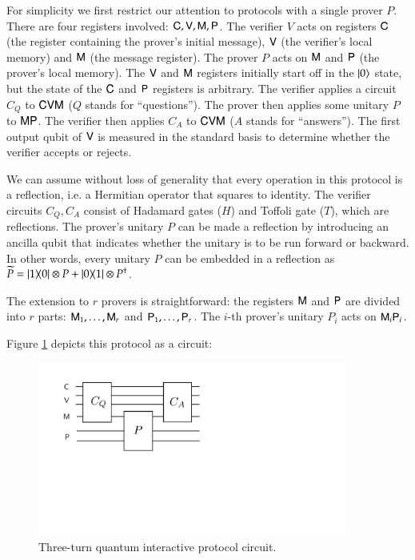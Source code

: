 
For simplicity we first restrict our attention to protocols with a single prover $P$. There are four registers involved: ${\mathsf{C}}, {\mathsf{V}}, {\mathsf{M}}, {\mathsf{P}}$. The verifier $V$ acts on registers ${\mathsf{C}}$ (the register containing the prover's initial message), ${\mathsf{V}}$ (the verifier's local memory) and ${\mathsf{M}}$ (the message register). The prover $P$ acts on ${\mathsf{M}}$ and ${\mathsf{P}}$ (the prover's local memory). The ${\mathsf{V}}$ and ${\mathsf{M}}$ registers initially start off in the $|0\rangle$ state, but the state of the ${\mathsf{C}}$ and ${\mathsf{P}}$ registers is arbitrary. The verifier applies a circuit $C_Q$ to ${\mathsf{C}} {\mathsf{V}} {\mathsf{M}}$ ($Q$ stands for ``questions''). The prover then applies some unitary $P$ to ${\mathsf{M}} {\mathsf{P}}$. The verifier then applies $C_A$ to ${\mathsf{C}} {\mathsf{V}} {\mathsf{M}}$ ($A$ stands for ``answers''). The first output qubit of ${\mathsf{V}}$ is measured in the standard basis to determine whether the verifier accepts or rejects.

We can assume without loss of generality that every operation in this protocol is a reflection, i.e. a Hermitian operator that squares to identity. The verifier circuits $C_Q,C_A$ consist of Hadamard gates ($H$) and Toffoli gate ($T$), which are reflections. The prover's unitary $P$ can be made a reflection by introducing an ancilla qubit that indicates whether the unitary is to be run forward or backward. In other words, every unitary $P$ can be embedded in a reflection as $\widetilde{P} = |1\rangle\! \langle 0| \otimes P + |0\rangle\! \langle 1| \otimes P^\dagger$. 

The extension to $r$ provers is straightforward: the registers ${\mathsf{M}}$ and ${\mathsf{P}}$ are divided into $r$ parts: ${\mathsf{M}}_1,\ldots,{\mathsf{M}}_r$ and ${\mathsf{P}}_1,\ldots,{\mathsf{P}}_r$. The $i$-th prover's unitary $P_i$ acts on ${\mathsf{M}}_i {\mathsf{P}}_i$. 

Figure \ref{fig:qip} depicts this protocol as a circuit:

\begin{figure}[H]
\begin{center}
\includegraphics[width=4in]{graphics/qip3.pdf}
\end{center}
\caption{Three-turn quantum interactive protocol circuit.}
\label{fig:qip}
\end{figure}

